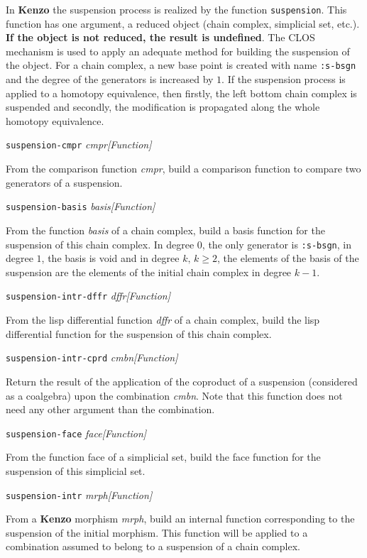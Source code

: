 In {\bf Kenzo} the suspension process is realized by the function {\tt suspension}.
This function has one argument, a reduced  object (chain complex, simplicial set, etc.).
{\bf If the object is not reduced, the result is undefined}.
The CLOS mechanism is used to apply an adequate method for building the suspension of the object.
For a chain complex, a new base point is created with name {\tt :s-bsgn} and the degree of the generators
is increased by $1$. If the suspension process is applied to a homotopy equivalence, then firstly,
the left bottom chain complex is suspended and secondly, the modification is propagated along
the  whole homotopy equivalence.
\par
\vskip 0.40cm
{\parindent=0mm
{\leftskip=5mm
{\tt suspension-cmpr} {\em cmpr}\hfill{\em[Function]} \par}
{\leftskip=15mm
From the comparison function {\em cmpr}, build a comparison function to compare
two generators of a suspension. \par}
{\leftskip=5mm
{\tt suspension-basis} {\em basis}\hfill{\em[Function]} \par}
{\leftskip=15mm
From the function {\em basis} of  a chain complex, build a basis function for
the suspension of this chain complex. In degree $0$, the only generator is {\tt :s-bsgn},
in degree $1$, the basis is void and in degree $k,\,k\ge 2$, the elements of the basis of
the suspension are the elements of the initial chain complex in degree $k-1$. \par}
{\leftskip=5mm
{\tt suspension-intr-dffr} {\em dffr}\hfill{\em[Function]} \par}
{\leftskip=15mm
From the lisp differential function {\em dffr} of a chain complex, build the
lisp differential function for the suspension of this chain complex. \par}
{\leftskip=5mm
{\tt suspension-intr-cprd} {\em cmbn}\hfill{\em[Function]} \par}
{\leftskip=15mm
Return the result of the  application of the coproduct of a suspension
(considered as a coalgebra) upon the combination {\em cmbn}. Note that
this function does not need any other argument than the combination. \par}
{\leftskip=5mm
{\tt suspension-face} {\em face}\hfill{\em[Function]} \par}
{\leftskip=15mm
From the function face of a simplicial set, build the face function
for the suspension of this simplicial set. \par}
{\leftskip=5mm
{\tt suspension-intr} {\em mrph}\hfill{\em[Function]} \par}
{\leftskip=15mm
From a {\bf Kenzo} morphism {\em mrph}, build an internal function
cor\-res\-pon\-ding to the suspension of the initial morphism. This function
will be applied to a combination assumed to belong to a suspension
of a chain complex. \par}
}
